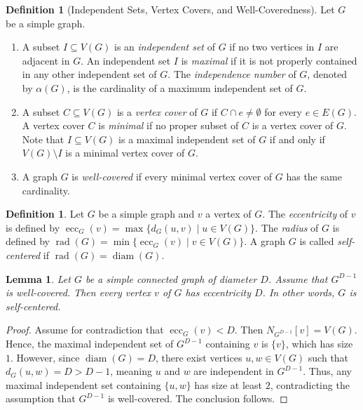 \documentclass[12pt]{amsart}
\numberwithin{equation}{section}
\newtheorem{lem}[thm]{\bf Lemma}
\theoremstyle{definition}
\newtheorem{defn}[thm]{Definition}
\DeclareMathOperator{\rad}{rad}
\DeclareMathOperator{\ecc}{ecc}
\DeclareMathOperator{\diam}{diam}
\begin{document}
\begin{defn}[Independent Sets, Vertex Covers, and Well-Coveredness]
Let $G$ be a simple graph.
\begin{enumerate}
    \item A subset $I \subseteq V(G)$ is an \emph{independent set} of $G$ if no two vertices in $I$ are adjacent in $G$. An independent set $I$ is \emph{maximal} if it is not properly contained in any other independent set of $G$. The \emph{independence number} of $G$, denoted by $\alpha(G)$, is the cardinality of a maximum independent set of $G$.
    \item A subset $C \subseteq V(G)$ is a \emph{vertex cover} of $G$ if $C \cap e \neq \emptyset$ for every $e \in E(G)$. A vertex cover $C$ is \emph{minimal} if no proper subset of $C$ is a vertex cover of $G$. Note that $I \subseteq V(G)$ is a maximal independent set of $G$ if and only if $V(G) \setminus I$ is a minimal vertex cover of $G$.
    \item A graph $G$ is \emph{well-covered} if every minimal vertex cover of $G$ has the same cardinality.
\end{enumerate}
\end{defn}


\begin{defn} 
Let $G$ be a simple graph and $v$ a vertex of $G$. The \emph{eccentricity} of $v$ is defined by $\ecc_G(v) = \max \{d_G(u,v) \mid u \in V(G)\}$. The \emph{radius} of $G$ is defined by $\rad(G) = \min \{ \ecc_G(v) \mid v \in V(G)\}$. A graph $G$ is called \emph{self-centered} if $\rad(G) = \diam(G)$.
\end{defn}

\begin{lem}\label{lem_ecc} 
Let $G$ be a simple connected graph of diameter $D$. Assume that $G^{D-1}$ is well-covered. Then every vertex $v$ of $G$ has eccentricity $D$. In other words, $G$ is self-centered.
\end{lem}

\begin{proof} 
Assume for contradiction that $\ecc_G(v) < D$. Then $N_{G^{D-1}}[v] = V(G)$. Hence, the maximal independent set of $G^{D-1}$ containing $v$ is $\{v\}$, which has size $1$. However, since $\diam(G) = D$, there exist vertices $u, w \in V(G)$ such that $d_G(u,w) = D > D-1$, meaning $u$ and $w$ are independent in $G^{D-1}$. Thus, any maximal independent set containing $\{u, w\}$ has size at least $2$, contradicting the assumption that $G^{D-1}$ is well-covered. The conclusion follows.
\end{proof}
\end{document}
